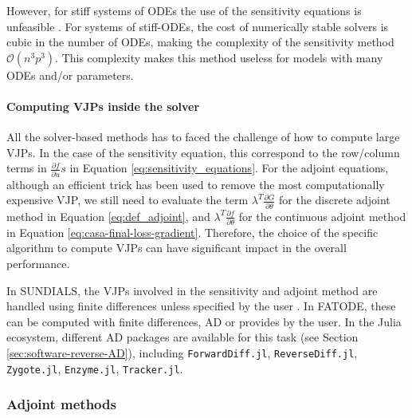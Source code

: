 However, for stiff systems of ODEs the use of the sensitivity equations is unfeasible \cite{kim_stiff_2021}.
For systems of stiff-ODEs, the cost of numerically stable solvers is cubic in the number of ODEs\cite{hairer-solving-2}, making the complexity of the sensitivity method $\mathcal{O}(n^3p^3)$. 
This complexity makes this method useless for models with many ODEs and/or parameters. 


\paragraph{Computing VJPs inside the solver}

All the solver-based methods has to faced the challenge of how to compute large VJPs. 
In the case of the sensitivity equation, this correspond to the row/column terms in $\frac{\partial f}{\partial u} s $ in Equation \eqref{eq:sensitivity_equations}.
For the adjoint equations, although an efficient trick has been used to remove the most computationally expensive VJP, we still need to evaluate the term $\lambda^T \frac{\partial G}{\partial \theta}$ for the discrete adjoint method in Equation \eqref{eq:def_adjoint}, and $\lambda^T \frac{\partial f}{\partial \theta}$ for the continuous adjoint method in Equation \eqref{eq:casa-final-loss-gradient}. 
Therefore, the choice of the specific algorithm to compute VJPs can have significant impact in the overall performance. 

In SUNDIALS, the VJPs involved in the sensitivity and adjoint method are handled using finite differences unless specified by the user \cite{SUNDIALS-hindmarsh2005sundials}.
In FATODE, these can be computed with finite differences, AD or provides by the user.
In the Julia ecosystem, different AD packages are available for this task (see Section \ref{sec:software-reverse-AD}), including \texttt{ForwardDiff.jl}, \texttt{ReverseDiff.jl}, \texttt{Zygote.jl}\cite{Innes_Zygote}, \texttt{Enzyme.jl}\cite{moses_Enzyme}, \texttt{Tracker.jl}.

\subsubsection{Adjoint methods}
\label{section:computing-adjoints}


